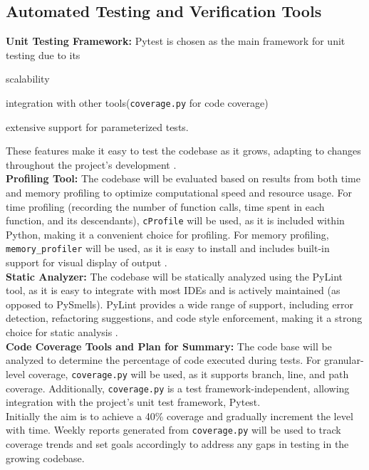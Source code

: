 \documentclass[12pt, titlepage]{article}
\begin{document}
\subsection{Automated Testing and Verification Tools}

\textbf{Unit Testing Framework:} Pytest is chosen as the main framework for unit testing due to its \begin{inparaenum}[(i)]
                                                                                                        \item scalability
                                                                                                        \item integration with other tools(\texttt{coverage.py} for code coverage)
                                                                                                        \item extensive support for parameterized tests.
\end{inparaenum} These features make it easy to test the codebase as it grows, adapting to changes throughout the project's development \citep{pytest}.\\

\noindent\textbf{Profiling Tool:} The codebase will be evaluated based on results from both time and memory profiling to optimize computational speed and resource usage. For time profiling (recording the number of function calls, time spent in each function, and its descendants), \texttt{cProfile} will be used, as it is included within Python, making it a convenient choice for profiling. For memory profiling, \texttt{memory\_profiler} will be used, as it is easy to install and includes built-in support for visual display of output \citep{memory_profiler}.\\

\noindent\textbf{Static Analyzer:} The codebase will be statically analyzed using the PyLint tool, as it is easy to integrate with most IDEs and is actively maintained (as opposed to PySmells). PyLint provides a wide range of support, including error detection, refactoring suggestions, and code style enforcement, making it a strong choice for static analysis \citep{pylint}.\\

\noindent\textbf{Code Coverage Tools and Plan for Summary:} The code base will be analyzed to determine the percentage of code executed during tests. For granular-level coverage, \texttt{coverage.py} will be used, as it supports branch, line, and path coverage. Additionally, \texttt{coverage.py} is a test framework-independent, allowing integration with the project's unit test framework, Pytest.\\
Initially the aim is to achieve a 40\% coverage and gradually increment the level with time. Weekly reports generated from \texttt{coverage.py} will be used to track coverage trends and set goals accordingly to address any gaps in testing in the growing codebase.\\
\end{document}
